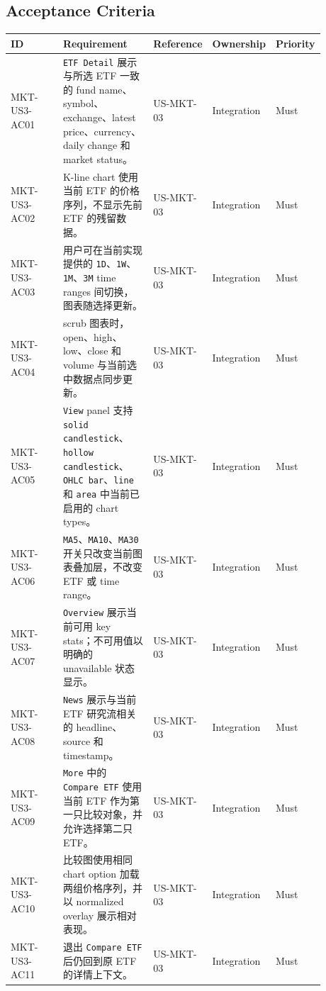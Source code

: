 \subsection{Acceptance Criteria}
\begingroup
\small
\begin{longtable}{L{0.18\linewidth}L{0.30\linewidth}L{0.18\linewidth}L{0.12\linewidth}L{0.10\linewidth}}
\toprule
\textbf{ID} & \textbf{Requirement} & \textbf{Reference} & \textbf{Ownership} & \textbf{Priority} \\
\midrule
MKT-US3-AC01 & \texttt{ETF Detail} 展示与所选 ETF 一致的 fund name、symbol、exchange、latest price、currency、daily change 和 market status。 & US-MKT-03 & Integration & Must \\
MKT-US3-AC02 & K-line chart 使用当前 ETF 的价格序列，不显示先前 ETF 的残留数据。 & US-MKT-03 & Integration & Must \\
MKT-US3-AC03 & 用户可在当前实现提供的 \texttt{1D}、\texttt{1W}、\texttt{1M}、\texttt{3M} time ranges 间切换，图表随选择更新。 & US-MKT-03 & Integration & Must \\
MKT-US3-AC04 & scrub 图表时，open、high、low、close 和 volume 与当前选中数据点同步更新。 & US-MKT-03 & Integration & Must \\
MKT-US3-AC05 & \texttt{View} panel 支持 \texttt{solid candlestick}、\texttt{hollow candlestick}、\texttt{OHLC bar}、\texttt{line} 和 \texttt{area} 中当前已启用的 chart types。 & US-MKT-03 & Integration & Must \\
MKT-US3-AC06 & \texttt{MA5}、\texttt{MA10}、\texttt{MA30} 开关只改变当前图表叠加层，不改变 ETF 或 time range。 & US-MKT-03 & Integration & Must \\
MKT-US3-AC07 & \texttt{Overview} 展示当前可用 key stats；不可用值以明确的 unavailable 状态显示。 & US-MKT-03 & Integration & Must \\
MKT-US3-AC08 & \texttt{News} 展示与当前 ETF 研究流相关的 headline、source 和 timestamp。 & US-MKT-03 & Integration & Must \\
MKT-US3-AC09 & \texttt{More} 中的 \texttt{Compare ETF} 使用当前 ETF 作为第一只比较对象，并允许选择第二只 ETF。 & US-MKT-03 & Integration & Must \\
MKT-US3-AC10 & 比较图使用相同 chart option 加载两组价格序列，并以 normalized overlay 展示相对表现。 & US-MKT-03 & Integration & Must \\
MKT-US3-AC11 & 退出 \texttt{Compare ETF} 后仍回到原 ETF 的详情上下文。 & US-MKT-03 & Integration & Must \\
\bottomrule
\end{longtable}
\endgroup
\prdhr
\hypertarget{us-mkt-04}{}

